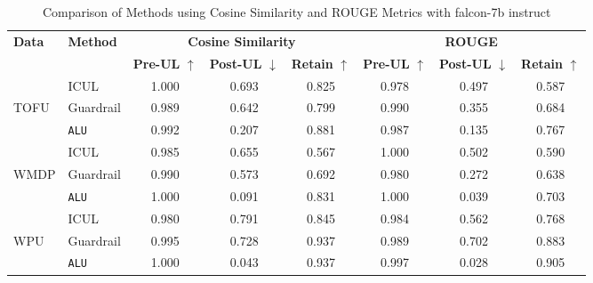 \begin{table*}[]
    \centering
    \caption{Comparison of Methods using Cosine Similarity and ROUGE Metrics with falcon-7b instruct}
    \begin{tabular}{llccc|ccc}
        \toprule
        \textbf{Data}&\textbf{Method} & \multicolumn{3}{c}{\textbf{Cosine Similarity}} & \multicolumn{3}{c}{\textbf{ROUGE}} \\
        \cmidrule(lr){3-5} \cmidrule(lr){6-8}
         & & \textbf{Pre-UL} $\uparrow$ & \textbf{Post-UL} $\downarrow$ & \textbf{Retain} $\uparrow$ & \textbf{Pre-UL} $\uparrow$ & \textbf{Post-UL} $\downarrow$ & \textbf{Retain} $\uparrow$ \\
        \midrule
        &ICUL & 1.000 & 0.693 & 0.825 & 0.978 & 0.497 & 0.587 \\
        TOFU &Guardrail & 0.989 & 0.642 & 0.799 & 0.990 & 0.355 & 0.684 \\
        &\texttt{ALU}  & 0.992 & 0.207 & 0.881 & 0.987 & 0.135 & 0.767 \\
        \midrule
        &ICUL  & 0.985 & 0.655 & 0.567 & 1.000 & 0.502 & 0.590 \\
        WMDP & Guardrail  & 0.990 & 0.573 & 0.692 & 0.980 & 0.272 & 0.638 \\
        &\texttt{ALU} & 1.000 & 0.091 & 0.831 & 1.000 & 0.039 & 0.703 \\
        \midrule
        &ICUL  & 0.980 & 0.791 & 0.845 & 0.984 & 0.562 & 0.768 \\
        WPU &Guardrail & 0.995 & 0.728 & 0.937 & 0.989 & 0.702 & 0.883 \\
        &\texttt{ALU} & 1.000 & 0.043 & 0.937 & 0.997 & 0.028 & 0.905 \\
        
        \bottomrule
    \end{tabular}
\label{tab:t25}    
\end{table*}

